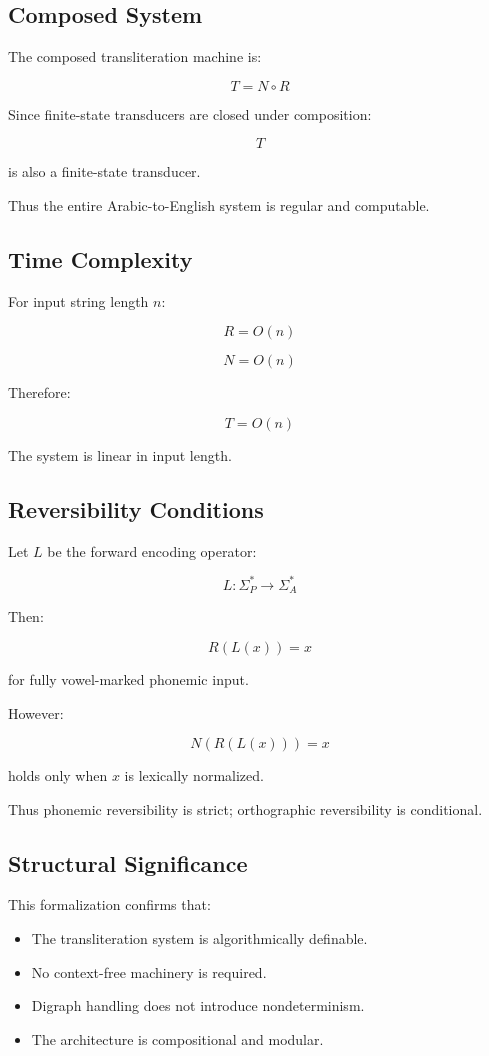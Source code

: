 \documentclass[12pt]{article}
\begin{document}
\subsection{Composed System}

The composed transliteration machine is:

\[
T = N \circ R
\]

Since finite-state transducers are closed under composition:

\[
T
\]

is also a finite-state transducer.

Thus the entire Arabic-to-English system is regular and computable.

\subsection{Time Complexity}

For input string length $n$:

\[
R = O(n)
\]

\[
N = O(n)
\]

Therefore:

\[
T = O(n)
\]

The system is linear in input length.

\subsection{Reversibility Conditions}

Let $L$ be the forward encoding operator:

\[
L : \Sigma_P^\ast \rightarrow \Sigma_A^\ast
\]

Then:

\[
R(L(x)) = x
\]

for fully vowel-marked phonemic input.

However:

\[
N(R(L(x))) = x
\]

holds only when $x$ is lexically normalized.

Thus phonemic reversibility is strict; orthographic reversibility is conditional.

\subsection{Structural Significance}

This formalization confirms that:

\begin{itemize}
\item The transliteration system is algorithmically definable.
\item No context-free machinery is required.
\item Digraph handling does not introduce nondeterminism.
\item The architecture is compositional and modular.
\end{itemize}
\end{document}
